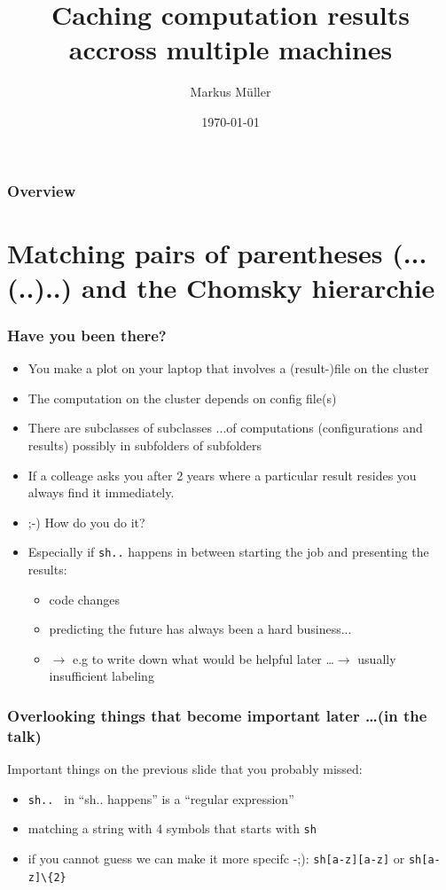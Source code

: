\documentclass[t]{beamer}
\title{Caching computation results accross multiple machines}
\author{Markus Müller}
\institute{IBG-3}
\date{\today}
\begin{document}
\maketitle

\begin{frame}
\frametitle{Overview}
\tableofcontents
\end{frame}

\section{Matching pairs of parentheses (...(..)..)  and the Chomsky hierarchie}

\begin{frame}
\frametitle{Have you been there?} 
\begin{itemize}
\pause
\item
You make a plot on your laptop that involves a (result-)file on the cluster
\pause
\item
The computation on the cluster depends on config file(s)
\pause
\item
There are subclasses of subclasses ...of computations (configurations and results) possibly in subfolders of subfolders
\pause
\item
If a colleage asks you after 2 years where a particular result resides you always find it immediately.
\pause
\item 
\alert{ ;-)} How do \alert{you} do it? 
\pause
\item 
Especially if \texttt{sh..} happens in between starting the job and presenting the results:
  \begin{itemize}
  \item
  code changes
  \item
  predicting the future  has always been a hard business... 
  \item 
  $\rightarrow$ e.g to write down  what would be helpful later \dots $\rightarrow$ usually insufficient labeling
  \end{itemize}
\end{itemize}
\end{frame}

\begin{frame}
\frametitle{Overlooking things that become important later \dots (in the talk)} 
Important things on the previous slide that you probably missed:
\\
\begin{itemize}
  \item
  \texttt{sh.. } in ``sh.. happens'' is a ``regular expression'' 

  \item
  matching a string with 4 symbols that starts with \texttt{sh} 

  \item
  if you cannot guess  we can make it more specifc -;):
  \texttt{sh[a-z][a-z]} or \texttt{sh[a-z]\textbackslash \{2\}}
\end{itemize}
\end{frame}
\end{document}
